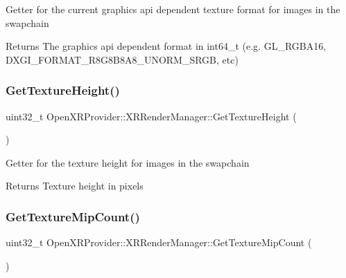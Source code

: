 Getter for the current graphics api dependent texture format for images in the swapchain \begin{DoxyReturn}{Returns}
The graphics api dependent format in int64\+\_\+t (e.\+g. G\+L\+\_\+\+R\+G\+B\+A16, D\+X\+G\+I\+\_\+\+F\+O\+R\+M\+A\+T\+\_\+\+R8\+G8\+B8\+A8\+\_\+\+U\+N\+O\+R\+M\+\_\+\+S\+R\+GB, etc) 
\end{DoxyReturn}
\mbox{\label{class_open_x_r_provider_1_1_x_r_render_manager_ae019694eb7b728af00f29eb09872a763}} 
\subsubsection{\texorpdfstring{GetTextureHeight()}{GetTextureHeight()}}
{\footnotesize\ttfamily uint32\+\_\+t Open\+X\+R\+Provider\+::\+X\+R\+Render\+Manager\+::\+Get\+Texture\+Height (\begin{DoxyParamCaption}{ }\end{DoxyParamCaption})\hspace{0.3cm}{\ttfamily [inline]}}

Getter for the texture height for images in the swapchain \begin{DoxyReturn}{Returns}
Texture height in pixels 
\end{DoxyReturn}
\mbox{\label{class_open_x_r_provider_1_1_x_r_render_manager_abee521a9347693c61be94f78af0a1602}} 
\subsubsection{\texorpdfstring{GetTextureMipCount()}{GetTextureMipCount()}}
{\footnotesize\ttfamily uint32\+\_\+t Open\+X\+R\+Provider\+::\+X\+R\+Render\+Manager\+::\+Get\+Texture\+Mip\+Count (\begin{DoxyParamCaption}{ }\end{DoxyParamCaption})\hspace{0.3cm}{\ttfamily [inline]}}

